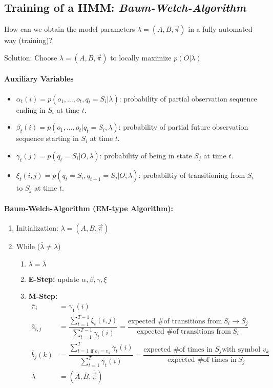 \subsection*{Training of a HMM: \emph{Baum-Welch-Algorithm}}

How can we obtain the model parameters \(\lambda = (A, B, \vec{\pi})\) in a fully automated way (training)?

Solution: Choose \(\lambda = (A, B, \vec{\pi})\) to locally maximize $p(O|\lambda)$

\paragraph{Auxiliary Variables}
\begin{itemize}
	\item $\alpha_t(i) = p(o_1,\dots, o_t, q_t=S_i|\lambda)$: probability of partial observation sequence ending in $S_i$ at time $t$.
	\item $\beta_t(i) = p(o_1,\dots, o_t | q_t=S_i, \lambda)$: probability of partial future observation sequence starting in $S_i$ at time $t$.
	\item $\gamma_t(j) = p(q_t=S_i|O, \lambda)$: probability of being in state $S_j$ at time $t$.
	\item $\xi_t(i,j) = p(q_t=S_i, q_{t+1}=S_j|O, \lambda)$: probabiltiy of transitioning from $S_i$ to $S_j$ at time $t$.
\end{itemize}

\paragraph{Baum-Welch-Algorithm (EM-type Algorithm):}

\begin{enumerate}
    \item Initialization: \(\lambda = (A, B, \vec{\pi})\)
    \item While ($\bar{\lambda} \neq \lambda$) {
		\begin{enumerate}
			\item $\lambda = \bar{\lambda}$
			\item \textbf{E-Step:} update $\alpha, \beta, \gamma, \xi$
			\item \textbf{M-Step:}
			\begin{align*}
				\bar{\pi}_i &= \gamma_1(i) \\
				\bar{a}_{i,j} &= \dfrac{\sum_{t=1}^{T-1} \xi_t(i,j)}{\sum_{t=1}^{T-1} \gamma_t(i)} = \dfrac{\text{expected \# of transitions from} \ S_i \rightarrow S_j}{\text{expected \# of transitions from} \ S_i} \\
				\bar{b}_{j}(k) &= \dfrac{\sum_{t=1 \text{ if } o_t=v_k}^{T} \gamma_t(i)}{\sum_{t=1}^{T} \gamma_t(i)} = \dfrac{\text{expected \# of times in }S_j \text{with symbol }v_k}{\text{expected \# of times in} \ S_j} \\
				\bar{\lambda} &= (\bar{A}, \bar{B}, \bar{\vec{\pi}})
			\end{align*}
		\end{enumerate}
		}
\end{enumerate}



